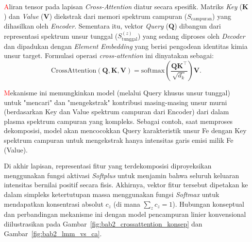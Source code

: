 \textcolor{red}{A}liran tensor pada lapisan \textit{Cross-Attention} diatur secara spesifik. Matriks \textit{Key} ($\mathbf{K}$) dan \textit{Value} ($\mathbf{V}$) diekstrak dari memori spektrum campuran ($S_{\mathrm{campuran}}$) yang dihasilkan oleh \textit{Encoder}. Sementara itu, vektor \textit{Query} ($\mathbf{Q}$) dibangun dari representasi spektrum unsur tunggal ($S_{\mathrm{tunggal}}^{(z)}$) yang sedang diproses oleh \textit{Decoder} dan dipadukan dengan \textit{Element Embedding} yang berisi pengodean identitas kimia unsur target. Formulasi operasi \textit{cross-attention} ini dinyatakan sebagai:
\begin{equation} \label{eq:bab2_crossattention}
\mathrm{CrossAttention}(\mathbf{Q},\mathbf{K},\mathbf{V}) = \mathrm{softmax}\!\left(\frac{\mathbf{Q}\mathbf{K}^\top}{\sqrt{d_k}}\right)\mathbf{V}.
\end{equation}

\textcolor{red}{M}ekanisme ini memungkinkan model (melalui Query khusus unsur tunggal) untuk "mencari" dan "mengekstrak" kontribusi masing-masing unsur murni (berdasarkan Key dan Value spektrum campuran dari Encoder) dari dalam plasma spektrum campuran yang kompleks. Sebagai contoh, saat memproses dekomposisi, model akan mencocokkan Query karakteristik unsur Fe dengan Key spektrum campuran untuk mengekstrak hanya intensitas garis emisi milik Fe (Value).

Di akhir lapisan, representasi fitur yang terdekomposisi diproyeksikan menggunakan fungsi aktivasi \textit{Softplus} untuk menjamin bahwa seluruh keluaran intensitas bernilai positif secara fisis. Akhirnya, vektor fitur tersebut dipetakan ke dalam simpleks ketertutupan massa menggunakan fungsi \textit{Softmax} untuk mendapatkan konsentrasi absolut $c_z$ (di mana $\sum_z c_z = 1$). Hubungan konseptual dan perbandingan mekanisme ini dengan model pencampuran linier konvensional diilustrasikan pada Gambar~\ref{fig:bab2_crossattention_konsep} dan Gambar~\ref{fig:bab2_lmm_vs_ca}.

